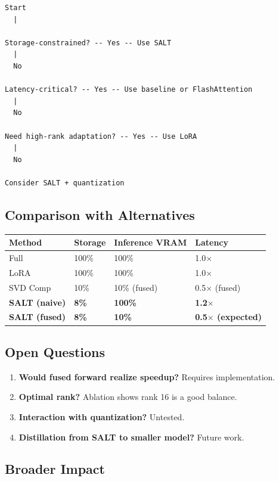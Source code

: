 \begin{lstlisting}
Start
  |
   
Storage-constrained? -- Yes -- Use SALT
  |
  No
   
Latency-critical? -- Yes -- Use baseline or FlashAttention
  |
  No
   
Need high-rank adaptation? -- Yes -- Use LoRA
  |
  No
   
Consider SALT + quantization
\end{lstlisting}

\subsection{Comparison with Alternatives}

\begin{table}[H]
\centering
\small
\begin{tabular}{llll}
\toprule
\textbf{Method} & \textbf{Storage} & \textbf{Inference VRAM} & \textbf{Latency} \\
\midrule
Full & 100\% & 100\% & 1.0$\times$ \\
LoRA & 100\% & 100\% & 1.0$\times$ \\
SVD Comp & 10\% & 10\% (fused) & 0.5$\times$ (fused) \\
\textbf{SALT (naive)} & \textbf{8\%} & \textbf{100\%} & \textbf{1.2$\times$} \\
\textbf{SALT (fused)} & \textbf{8\%} & \textbf{10\%} & \textbf{0.5$\times$ (expected)} \\
\bottomrule
\end{tabular}
\end{table}

\subsection{Open Questions}

\begin{enumerate}
\item \textbf{Would fused forward realize speedup?} Requires implementation.
\item \textbf{Optimal rank?} Ablation shows rank 16 is a good balance.
\item \textbf{Interaction with quantization?} Untested.
\item \textbf{Distillation from SALT to smaller model?} Future work.

\end{enumerate}
\subsection{Broader Impact}

